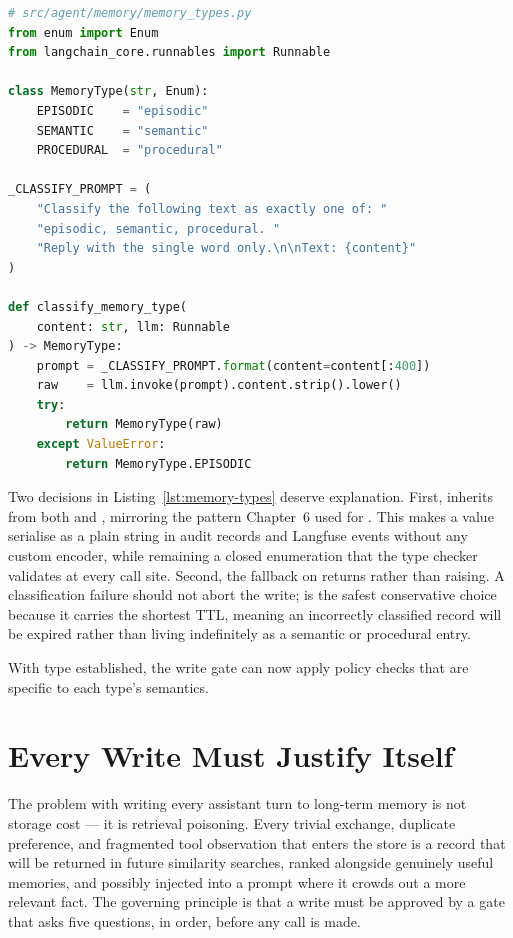 \begin{lstlisting}[language=Python,
  caption={MemoryType enum and LLM-backed classifier with safe fallback},
  label={lst:memory-types}]
# src/agent/memory/memory_types.py
from enum import Enum
from langchain_core.runnables import Runnable

class MemoryType(str, Enum):
    EPISODIC    = "episodic"
    SEMANTIC    = "semantic"
    PROCEDURAL  = "procedural"

_CLASSIFY_PROMPT = (
    "Classify the following text as exactly one of: "
    "episodic, semantic, procedural. "
    "Reply with the single word only.\n\nText: {content}"
)

def classify_memory_type(
    content: str, llm: Runnable
) -> MemoryType:
    prompt = _CLASSIFY_PROMPT.format(content=content[:400])
    raw    = llm.invoke(prompt).content.strip().lower()
    try:
        return MemoryType(raw)
    except ValueError:
        return MemoryType.EPISODIC
\end{lstlisting}

Two decisions in Listing~\ref{lst:memory-types} deserve explanation. First,
 inherits from both  and , mirroring the
pattern Chapter~6 used for . This makes a 
value serialise as a plain string in audit records and Langfuse events without
any custom encoder, while remaining a closed enumeration that the type checker
validates at every call site. Second, the fallback on  returns
 rather than raising. A classification failure should not abort
the write;  is the safest conservative choice because it carries
the shortest TTL, meaning an incorrectly classified record will be expired
rather than living indefinitely as a semantic or procedural entry.

With type established, the write gate can now apply policy checks that are
specific to each type's semantics.

\section{Every Write Must Justify Itself}
\label{sec:write-gate}

The problem with writing every assistant turn to long-term memory is not
storage cost --- it is retrieval poisoning. Every trivial exchange, duplicate
preference, and fragmented tool observation that enters the store is a record
that will be returned in future similarity searches, ranked alongside genuinely
useful memories, and possibly injected into a prompt where it crowds out a
more relevant fact. The governing principle is that a write must be approved by
a gate that asks five questions, in order, before any  call is
made.

